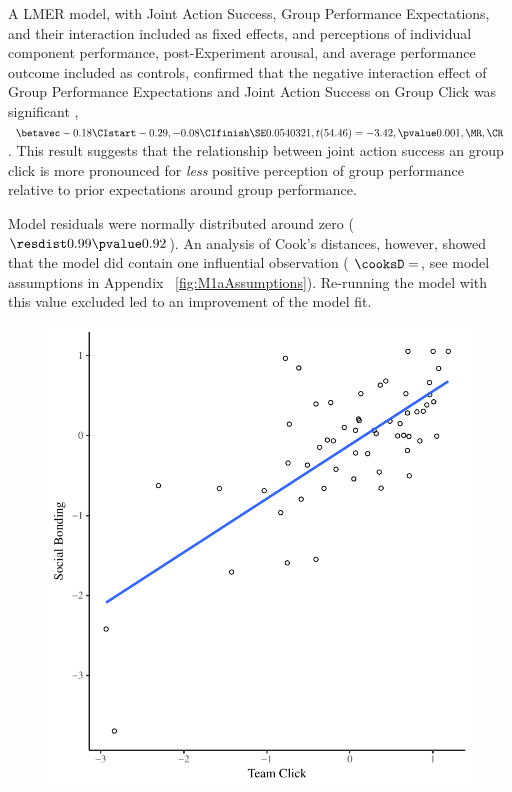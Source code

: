A LMER model, with Joint Action Success, Group Performance Expectations, and their interaction included as fixed effects, and perceptions of individual component performance, post-Experiment arousal, and average performance outcome included as controls, confirmed that the negative interaction effect of Group Performance Expectations and Joint Action Success on Group Click was significant
, $\betavec -0.18 \CIstart -0.29, -0.08 \CIfinish \SE 0.0540321, t(54.46) = -3.42, \pvalue 0.001, \MR , \CR $.  This result suggests that the relationship between joint action success an group click is more pronounced for \textit{less} positive perception of group performance relative to prior expectations around group performance.

Model residuals were normally distributed around zero ( $\resdist 0.99 \pvalue 0.92$).  An analysis of Cook's distances, however, showed that the model did contain one influential observation ( $\cooksD =  $, see model assumptions in Appendix  ~\ref{fig:M1aAssumptions}).  Re-running the model with this value excluded led to an improvement of the model fit.






\begin{figure}
  \centering
  \includegraphics{images/groupClickBondScatter}
  \label{fig:groupClickBondScatter}
\end{figure}


